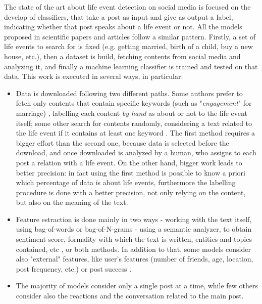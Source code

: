 The state of the art about life event detection on social media is focused on the develop of classifiers, that take a post as input and give as output a label, indicating whether that post speaks about a life event or not. All the models proposed in scientific papers and articles follow a similar pattern. Firstly, a set of life events to search for is fixed (e.g. getting married, birth of a child, buy a new house, etc.), then a dataset is build, fetching contents from social media and analyzing it, and finally a machine learning classifier is trained and tested on that data. This work is executed in several ways, in particular:
\begin{itemize}
\item Data is downloaded following two different paths. Some authors prefer to fetch only contents that contain specific keywords (such as "\textit{engagement}" for marriage) \cite{dickinson2015identifying, cavalinclassification, moyanolife, khobarekar2013detecting}, labelling each content \textit{by hand} as about or not to the life event itself; some other search for contents randomly, considering a text related to the life event if it contains at least one keyword \cite{choudhury2014personal, di2013detecting}. The first method requires a bigger effort than the second one, because data is selected before the download, and once downloaded is analyzed by a human, who assigns to each post a relation with a life event. On the other hand, bigger work leads to better precision: in fact using the first method is possible to know a priori which percentage of data is about life events, furthermore the labelling procedure is done with a better precision, not only relying on the content, but also on the meaning of the text.
\item Feature estraction is done mainly in two ways - working with the text itself, using bag-of-words or bag-of-N-grams \cite{cavalinclassification, di2013detecting, li2014major} - using a semantic analyzer, to obtain sentiment score, formality with which the text is written, entities and topics contained, etc \cite{khobarekar2013detecting}, or both methods. In addition to that, some models consider also "external" features, like user's features (number of friends, age, location, post frequency, etc.) or post success \cite{dickinson2015identifying}.
\item The majority of models consider only a single post at a time, while few others \cite{cavalin2015multiple, moyanolife} consider also the reactions and the conversation related to the main post.
\end{itemize}

